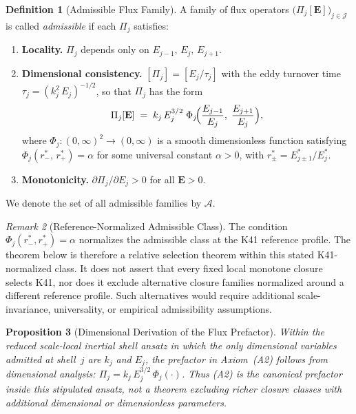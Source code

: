 \documentclass[12pt,a4paper]{article}
\theoremstyle{definition}
\newtheorem{definition}{Definition}[section]
\theoremstyle{plain}
\newtheorem{proposition}[definition]{Proposition}
\theoremstyle{remark}
\newtheorem{remark}[definition]{Remark}
\begin{document}
\begin{definition}[Admissible Flux Family]\label{def:admissible}
A family of flux operators $\bigl(\Pi_j[\mathbf{E}]\bigr)_{j \in
\mathcal{J}}$ is called \emph{admissible} if each $\Pi_j$ satisfies:
\begin{enumerate}
  \item[\textup{(A1)}] \textbf{Locality.}\;
    $\Pi_j$ depends only on $E_{j-1},\, E_j,\, E_{j+1}$.
  \item[\textup{(A2)}] \textbf{Dimensional consistency.}\;
    $[\Pi_j] = [E_j / \tau_j]$ with the eddy turnover time
    $\tau_j = (k_j^2\,E_j)^{-1/2}$, so that $\Pi_j$ has the form
    \begin{equation}\label{eq:closure_general}
      \Pi_j[\mathbf{E}]
      \;=\;
      k_j\,E_j^{3/2}\;\Phi_j\!\Bigl(
        \frac{E_{j-1}}{E_j},\;
        \frac{E_{j+1}}{E_j}
      \Bigr),
    \end{equation}
    where $\Phi_j : (0,\infty)^2 \to (0,\infty)$ is a smooth
    dimensionless function satisfying $\Phi_j(r^*_{-},\, r^*_{+}) = \alpha$
    for some universal constant $\alpha > 0$, with
    $r^*_{\pm} = E_{j \pm 1}^* / E_j^*$.
  \item[\textup{(A3)}] \textbf{Monotonicity.}\;
    $\partial \Pi_j / \partial E_j > 0$ for all $\mathbf{E} > 0$.
\end{enumerate}
We denote the set of all admissible families by $\mathscr{A}$.
\end{definition}

\begin{remark}[Reference-Normalized Admissible Class]\label{rem:reference-normalized-class}\label{rem:reference-normalised-class}
The condition $\Phi_j(r^*_{-},r^*_{+})=\alpha$ normalizes the admissible
class at the K41 reference profile.  The theorem below is therefore a
relative selection theorem within this stated K41-normalized class.  It
does not assert that every fixed local monotone closure selects K41, nor
does it exclude alternative closure families normalized around a different
reference profile.  Such alternatives would require additional
scale-invariance, universality, or empirical admissibility assumptions.
\end{remark}

\begin{proposition}[Dimensional Derivation of the Flux Prefactor]\label{prop:A2-derived}
Within the reduced scale-local inertial shell ansatz in which the only
dimensional variables admitted at shell~$j$ are $k_j$ and $E_j$, the
prefactor in Axiom~\textup{(A2)} follows from dimensional analysis:
$\Pi_j = k_j\,E_j^{3/2}\,\Phi_j(\cdot)$.  Thus (A2) is the canonical
prefactor inside this stipulated ansatz, not a theorem excluding richer
closure classes with additional dimensional or dimensionless parameters.
\end{proposition}
\end{document}

